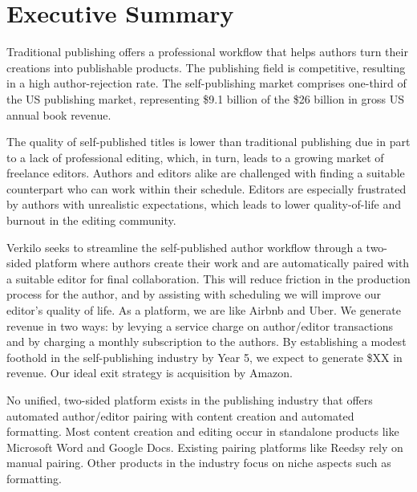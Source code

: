 \documentclass[10pt,openany]{book}
\begin{document}
      \listoftables
  
      \listoffigures
  
\newpage %

\pagestyle{fancy}
\hypertarget{executive-summary}{%
\chapter{Executive Summary}\label{executive-summary}}

Traditional publishing offers a professional workflow that helps authors
turn their creations into publishable products. The publishing field is
competitive, resulting in a high author-rejection rate. The
self-publishing market comprises one-third of the US publishing market,
representing \$9.1 billion of the \$26 billion in gross US annual book
revenue.

The quality of self-published titles is lower than traditional
publishing due in part to a lack of professional editing, which, in
turn, leads to a growing market of freelance editors. Authors and
editors alike are challenged with finding a suitable counterpart who can
work within their schedule. Editors are especially frustrated by authors
with unrealistic expectations, which leads to lower quality-of-life and
burnout in the editing community.

Verkilo seeks to streamline the self-published author workflow through a
two-sided platform where authors create their work and are automatically
paired with a suitable editor for final collaboration. This will reduce
friction in the production process for the author, and by assisting with
scheduling we will improve our editor's quality of life. As a platform,
we are like Airbnb and Uber. We generate revenue in two ways: by levying
a service charge on author/editor transactions and by charging a monthly
subscription to the authors. By establishing a modest foothold in the
self-publishing industry by Year 5, we expect to generate \$XX in
revenue. Our ideal exit strategy is acquisition by Amazon.

No unified, two-sided platform exists in the publishing industry that
offers automated author/editor pairing with content creation and
automated formatting. Most content creation and editing occur in
standalone products like Microsoft Word and Google Docs. Existing
pairing platforms like Reedsy rely on manual pairing. Other products in
the industry focus on niche aspects such as formatting.
\end{document}
